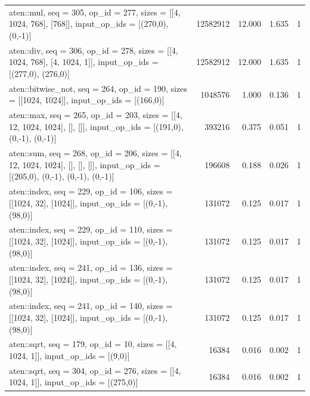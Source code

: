 \begin{tabular}{lrrrr}
aten::mul, seq = 305, op\_id = 277, sizes = [[4, 1024, 768], [768]], input\_op\_ids = [(270,0), (0,-1)] & 12582912 & 12.000 & 1.635 & 1 \\
aten::div, seq = 306, op\_id = 278, sizes = [[4, 1024, 768], [4, 1024, 1]], input\_op\_ids = [(277,0), (276,0)] & 12582912 & 12.000 & 1.635 & 1 \\
aten::bitwise\_not, seq = 264, op\_id = 190, sizes = [[1024, 1024]], input\_op\_ids = [(166,0)] & 1048576 & 1.000 & 0.136 & 1 \\
aten::max, seq = 265, op\_id = 203, sizes = [[4, 12, 1024, 1024], [], []], input\_op\_ids = [(191,0), (0,-1), (0,-1)] & 393216 & 0.375 & 0.051 & 1 \\
aten::sum, seq = 268, op\_id = 206, sizes = [[4, 12, 1024, 1024], [], [], []], input\_op\_ids = [(205,0), (0,-1), (0,-1), (0,-1)] & 196608 & 0.188 & 0.026 & 1 \\
aten::index, seq = 229, op\_id = 106, sizes = [[1024, 32], [1024]], input\_op\_ids = [(0,-1), (98,0)] & 131072 & 0.125 & 0.017 & 1 \\
aten::index, seq = 229, op\_id = 110, sizes = [[1024, 32], [1024]], input\_op\_ids = [(0,-1), (98,0)] & 131072 & 0.125 & 0.017 & 1 \\
aten::index, seq = 241, op\_id = 136, sizes = [[1024, 32], [1024]], input\_op\_ids = [(0,-1), (98,0)] & 131072 & 0.125 & 0.017 & 1 \\
aten::index, seq = 241, op\_id = 140, sizes = [[1024, 32], [1024]], input\_op\_ids = [(0,-1), (98,0)] & 131072 & 0.125 & 0.017 & 1 \\
aten::sqrt, seq = 179, op\_id = 10, sizes = [[4, 1024, 1]], input\_op\_ids = [(9,0)] & 16384 & 0.016 & 0.002 & 1 \\
aten::sqrt, seq = 304, op\_id = 276, sizes = [[4, 1024, 1]], input\_op\_ids = [(275,0)] & 16384 & 0.016 & 0.002 & 1 \\
\bottomrule
\end{tabular}
